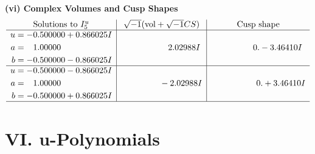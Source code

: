 \documentclass[1p]{elsarticle_modified}
\theoremstyle{definition}
\newcommand{\I}{\sqrt{-1}}
\begin{document}
\newpage\flushleft \textbf{(vi) Complex Volumes and Cusp Shapes}
$$\begin{array}{c|c|c}  
\text{Solutions to }I^u_{5}& \I (\text{vol} + \sqrt{-1}CS) & \text{Cusp shape}\\
 \hline 
\begin{aligned}
u &= -0.500000 + 0.866025 I \\
a &= \phantom{-}1.00000\phantom{ +0.000000I} \\
b &= -0.500000 - 0.866025 I\end{aligned}
 & \phantom{-0.000000 -}2.02988 I & \phantom{-0.000000 } 0. - 3.46410 I \\ \hline\begin{aligned}
u &= -0.500000 - 0.866025 I \\
a &= \phantom{-}1.00000\phantom{ +0.000000I} \\
b &= -0.500000 + 0.866025 I\end{aligned}
 & \phantom{-0.000000 } -2.02988 I & \phantom{-0.000000 -}0. + 3.46410 I\\
 \hline 
 \end{array}$$\newpage
\newpage\renewcommand{\arraystretch}{1}
\centering \section*{ VI. u-Polynomials}
\end{document}
